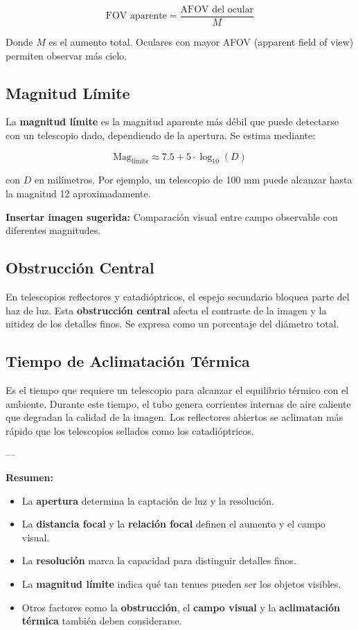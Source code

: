 \[
\text{FOV aparente} = \frac{\text{AFOV del ocular}}{M}
\]

Donde $M$ es el aumento total. Oculares con mayor AFOV (apparent field of view) permiten observar más cielo.

\subsection{Magnitud Límite}

La \textbf{magnitud límite} es la magnitud aparente más débil que puede detectarse con un telescopio dado, dependiendo de la apertura. Se estima mediante:

\[
\text{Mag}_{\text{límite}} \approx 7.5 + 5 \cdot \log_{10}(D)
\]

con $D$ en milímetros. Por ejemplo, un telescopio de 100 mm puede alcanzar hasta la magnitud 12 aproximadamente.

\vspace{0.3cm}
\textbf{Insertar imagen sugerida:} Comparación visual entre campo observable con diferentes magnitudes.

\subsection{Obstrucción Central}

En telescopios reflectores y catadióptricos, el espejo secundario bloquea parte del haz de luz. Esta \textbf{obstrucción central} afecta el contraste de la imagen y la nitidez de los detalles finos. Se expresa como un porcentaje del diámetro total.

\subsection{Tiempo de Aclimatación Térmica}

Es el tiempo que requiere un telescopio para alcanzar el equilibrio térmico con el ambiente. Durante este tiempo, el tubo genera corrientes internas de aire caliente que degradan la calidad de la imagen. Los reflectores abiertos se aclimatan más rápido que los telescopios sellados como los catadióptricos.

---

\textbf{Resumen:}  
\begin{itemize}
	\item La \textbf{apertura} determina la captación de luz y la resolución.
	\item La \textbf{distancia focal} y la \textbf{relación focal} definen el aumento y el campo visual.
	\item La \textbf{resolución} marca la capacidad para distinguir detalles finos.
	\item La \textbf{magnitud límite} indica qué tan tenues pueden ser los objetos visibles.
	\item Otros factores como la \textbf{obstrucción}, el \textbf{campo visual} y la \textbf{aclimatación térmica} también deben considerarse.
\end{itemize}






